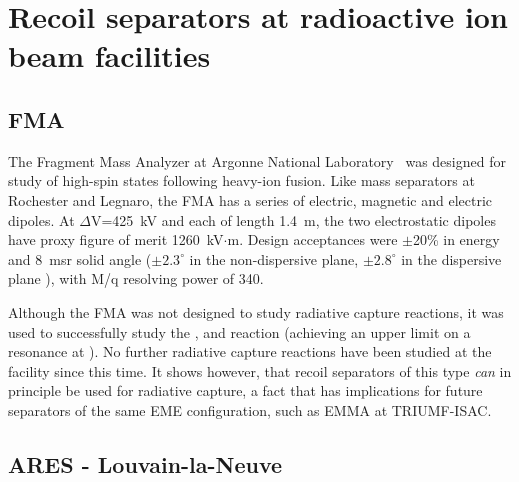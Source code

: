 \section{Recoil separators at radioactive ion beam facilities}

\subsection{FMA}
The Fragment Mass Analyzer at Argonne National Laboratory~\cite{Da92} was designed for study of high-spin states following heavy-ion fusion.  Like mass separators at Rochester and Legnaro, the FMA has a series of electric, magnetic and electric dipoles.   At $\Delta$V=425~kV and each of length 1.4~m, the two electrostatic dipoles have proxy figure of merit 1260~kV$\cdot$m.  Design acceptances were $\pm$20\% in energy and 8~msr solid angle ($\pm2.3^{\circ}$ in the non-dispersive plane, $\pm2.8^{\circ}$ in the dispersive plane \cite{dav12}), with M/q resolving power of 340.

Although the FMA was not designed to study radiative capture reactions, it was used to successfully study the , and   reaction \cite{reh97} (achieving an upper limit on a resonance at ). No further radiative capture reactions have been studied at the facility since this time. It shows however, that recoil separators of this type {\em can} in principle be used for radiative capture, a fact that has implications for future separators of the same EME configuration, such as EMMA at TRIUMF-ISAC. 


\subsection{ARES - Louvain-la-Neuve}

